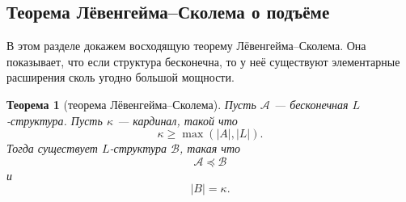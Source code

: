 \documentclass[12pt,a4paper,oneside,openany]{book}
\theoremstyle{definition}
\theoremstyle{plain}
\newtheorem{theorem}{Теорема}[chapter]
\theoremstyle{remark}
\begin{document}
\subsection{Теорема Лёвенгейма--Сколема о подъёме}

В этом разделе докажем восходящую теорему Лёвенгейма--Сколема. Она показывает, что если структура бесконечна, то у неё существуют элементарные расширения сколь угодно большой мощности.

\begin{theorem}[теорема Лёвенгейма--Сколема]
Пусть $\mathcal A$ — бесконечная $L$-структура. Пусть $\kappa$ — кардинал, такой что
\[
\kappa\ge \max(|A|,|L|).
\]
Тогда существует $L$-структура $\mathcal B$, такая что
\[
\mathcal A\preccurlyeq \mathcal B
\]
и
\[
|B|=\kappa.
\]
\end{theorem}
\end{document}

